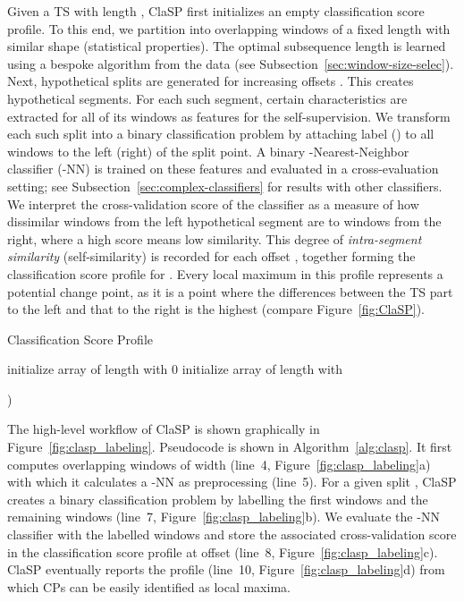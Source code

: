 \documentclass[pdflatex,sn-basic]{sn-jnl}
\begin{document}
Given a TS  with length , ClaSP first initializes an empty classification score profile. To this end, we partition  into overlapping windows of a fixed length  with similar shape (statistical properties). The optimal subsequence length  is learned using a bespoke algorithm from the data (see Subsection~\ref{sec:window-size-selec}). Next, hypothetical splits are generated for increasing offsets . This creates hypothetical segments. For each such segment, certain characteristics are extracted for all of its windows as features for the self-supervision. We transform each such split into a binary classification problem  by attaching label  () to all windows to the left (right) of the split point. A binary -Nearest-Neighbor classifier (-NN) is trained on these features and evaluated in a cross-evaluation setting; see Subsection~\ref{sec:complex-classifiers} for results with other classifiers. We interpret the cross-validation score of the classifier as a measure of how dissimilar windows from the left hypothetical segment are to windows from the right, where a high score means low similarity. This degree of \emph{intra-segment similarity} (self-similarity) is recorded for each offset , together forming the classification score profile for . Every local maximum in this profile represents a potential change point, as it is a point where the differences between the TS part to the left and that to the right is the highest (compare Figure~\ref{fig:ClaSP}). 

\begin{algorithm}[t]
	\caption{Classification Score Profile}\label{alg:clasp}
	\begin{algorithmic}[1]
			
			\State  initialize array of length  with 0
			\State  initialize array of length  with  
			
			\State  {}
			\State 
	    
			\For{} 
                \State  {}
			    \State )
			\EndFor 
			\State \Return{}
		\EndProcedure
	\end{algorithmic}
\end{algorithm}

The high-level workflow of ClaSP is shown graphically in Figure~\ref{fig:clasp_labeling}. Pseudocode is shown in Algorithm~\ref{alg:clasp}. It first computes  overlapping windows of width  (line~4, Figure~\ref{fig:clasp_labeling}a) with which it calculates a -NN as preprocessing (line~5). For a given split , ClaSP creates a binary classification problem by labelling the first  windows  and the remaining  windows  (line~7, Figure~\ref{fig:clasp_labeling}b). We evaluate the -NN classifier with the labelled windows and store the associated cross-validation score in the classification score profile at offset  (line~8, Figure~\ref{fig:clasp_labeling}c). ClaSP eventually reports the profile (line~10, Figure~\ref{fig:clasp_labeling}d) from which CPs can be easily identified as local maxima.
\end{document}
